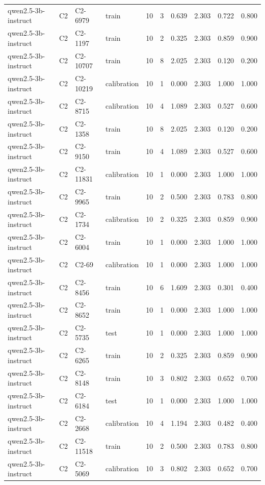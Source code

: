 \begin{table}
\begin{tabular}{llllrrrrrr}
qwen2.5-3b-instruct & C2 & C2-6979 & train & 10 & 3 & 0.639 & 2.303 & 0.722 & 0.800 \\
qwen2.5-3b-instruct & C2 & C2-1197 & train & 10 & 2 & 0.325 & 2.303 & 0.859 & 0.900 \\
qwen2.5-3b-instruct & C2 & C2-10707 & train & 10 & 8 & 2.025 & 2.303 & 0.120 & 0.200 \\
qwen2.5-3b-instruct & C2 & C2-10219 & calibration & 10 & 1 & 0.000 & 2.303 & 1.000 & 1.000 \\
qwen2.5-3b-instruct & C2 & C2-8715 & calibration & 10 & 4 & 1.089 & 2.303 & 0.527 & 0.600 \\
qwen2.5-3b-instruct & C2 & C2-1358 & train & 10 & 8 & 2.025 & 2.303 & 0.120 & 0.200 \\
qwen2.5-3b-instruct & C2 & C2-9150 & train & 10 & 4 & 1.089 & 2.303 & 0.527 & 0.600 \\
qwen2.5-3b-instruct & C2 & C2-11831 & calibration & 10 & 1 & 0.000 & 2.303 & 1.000 & 1.000 \\
qwen2.5-3b-instruct & C2 & C2-9965 & train & 10 & 2 & 0.500 & 2.303 & 0.783 & 0.800 \\
qwen2.5-3b-instruct & C2 & C2-1734 & calibration & 10 & 2 & 0.325 & 2.303 & 0.859 & 0.900 \\
qwen2.5-3b-instruct & C2 & C2-6004 & train & 10 & 1 & 0.000 & 2.303 & 1.000 & 1.000 \\
qwen2.5-3b-instruct & C2 & C2-69 & calibration & 10 & 1 & 0.000 & 2.303 & 1.000 & 1.000 \\
qwen2.5-3b-instruct & C2 & C2-8456 & train & 10 & 6 & 1.609 & 2.303 & 0.301 & 0.400 \\
qwen2.5-3b-instruct & C2 & C2-8652 & train & 10 & 1 & 0.000 & 2.303 & 1.000 & 1.000 \\
qwen2.5-3b-instruct & C2 & C2-5735 & test & 10 & 1 & 0.000 & 2.303 & 1.000 & 1.000 \\
qwen2.5-3b-instruct & C2 & C2-6265 & train & 10 & 2 & 0.325 & 2.303 & 0.859 & 0.900 \\
qwen2.5-3b-instruct & C2 & C2-8148 & train & 10 & 3 & 0.802 & 2.303 & 0.652 & 0.700 \\
qwen2.5-3b-instruct & C2 & C2-6184 & test & 10 & 1 & 0.000 & 2.303 & 1.000 & 1.000 \\
qwen2.5-3b-instruct & C2 & C2-2668 & calibration & 10 & 4 & 1.194 & 2.303 & 0.482 & 0.400 \\
qwen2.5-3b-instruct & C2 & C2-11518 & train & 10 & 2 & 0.500 & 2.303 & 0.783 & 0.800 \\
qwen2.5-3b-instruct & C2 & C2-5069 & calibration & 10 & 3 & 0.802 & 2.303 & 0.652 & 0.700 \\

\end{tabular}
\end{table}
